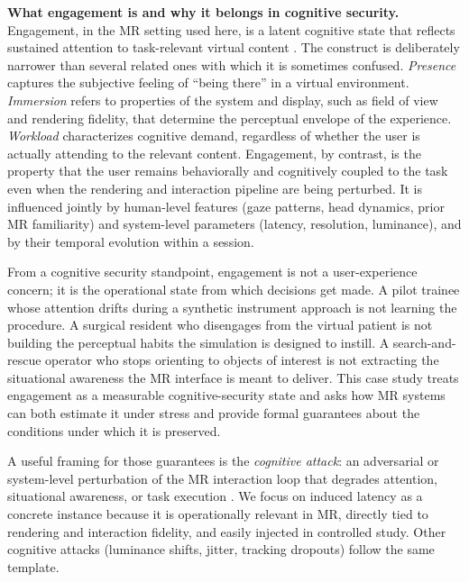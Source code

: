\documentclass[graybox]{svmult}
\begin{document}
\textbf{What engagement is and why it belongs in cognitive security.}
Engagement, in the MR setting used here, is a latent cognitive state that reflects sustained attention to task-relevant virtual content \citep{engagement2026mr}. The construct is deliberately narrower than several related ones with which it is sometimes confused. \emph{Presence} captures the subjective feeling of ``being there'' in a virtual environment. \emph{Immersion} refers to properties of the system and display, such as field of view and rendering fidelity, that determine the perceptual envelope of the experience. \emph{Workload} characterizes cognitive demand, regardless of whether the user is actually attending to the relevant content. Engagement, by contrast, is the property that the user remains behaviorally and cognitively coupled to the task even when the rendering and interaction pipeline are being perturbed. It is influenced jointly by human-level features (gaze patterns, head dynamics, prior MR familiarity) and system-level parameters (latency, resolution, luminance), and by their temporal evolution within a session.

From a cognitive security standpoint, engagement is not a user-experience concern; it is the operational state from which decisions get made. A pilot trainee whose attention drifts during a synthetic instrument approach is not learning the procedure. A surgical resident who disengages from the virtual patient is not building the perceptual habits the simulation is designed to instill. A search-and-rescue operator who stops orienting to objects of interest is not extracting the situational awareness the MR interface is meant to deliver. This case study treats engagement as a measurable cognitive-security state and asks how MR systems can both estimate it under stress and provide formal guarantees about the conditions under which it is preserved.

A useful framing for those guarantees is the \emph{cognitive attack}: an adversarial or system-level perturbation of the MR interaction loop that degrades attention, situational awareness, or task execution \citep{engagement2026mr}. We focus on induced latency as a concrete instance because it is operationally relevant in MR, directly tied to rendering and interaction fidelity, and easily injected in controlled study. Other cognitive attacks (luminance shifts, jitter, tracking dropouts) follow the same template.
\end{document}

